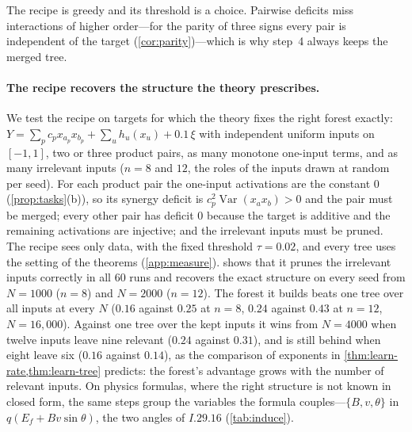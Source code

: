 \documentclass[11pt]{article}
\theoremstyle{definition}
\theoremstyle{remark}
\newcommand{\Var}{\operatorname{Var}}
\begin{document}
The recipe is greedy and its threshold is a choice.  Pairwise deficits miss interactions of
higher order---for the parity of three signs every pair is independent of the target
(\cref{cor:parity})---which is why step~4 always keeps the merged tree.  

\paragraph{The recipe recovers the structure the theory prescribes.}
We test the recipe on targets for which the theory fixes the right forest exactly:
$Y=\sum_pc_px_{a_p}x_{b_p}+\sum_uh_u(x_u)+0.1\,\xi$ with independent uniform inputs on $[-1,1]$, two or
three product pairs, as many monotone one-input terms, and as many irrelevant inputs ($n=8$
and $12$, the roles of the inputs drawn at random per seed).  For each product pair the
one-input activations are the constant $0$ (\cref{prop:tasks}(b)), so its synergy deficit is
$c_p^2\Var(x_ax_b)>0$ and the pair must be merged; every other pair has deficit $0$ because the
target is additive and the remaining activations are injective; and the irrelevant inputs
must be pruned.  The recipe sees only data, with the fixed threshold $\tau=0.02$, and every tree
uses the setting of the theorems (\cref{app:measure}).   shows that it prunes the
irrelevant inputs correctly in all $60$ runs and recovers the exact structure on every seed
from $N=1000$ ($n=8$) and $N=2000$ ($n=12$).  The forest it builds beats one tree over all
inputs at every $N$ ($0.16$ against $0.25$ at $n=8$, $0.24$ against $0.43$ at $n=12$, $N=16{,}000$).
Against one tree over the kept inputs it wins from $N=4000$ when twelve inputs leave nine
relevant ($0.24$ against $0.31$), and is still behind when eight leave six ($0.16$ against $0.14$),
as the comparison of exponents in \cref{thm:learn-rate,thm:learn-tree} predicts: the forest's
advantage grows with the number of relevant inputs.  On physics formulas, where the right
structure is not known in closed form, the same steps group the variables the formula
couples---$\{B,v,\theta\}$ in $q(E_f+Bv\sin\theta)$, the two angles of $I.29.16$
(\cref{tab:induce}).

\begin{table}[t]
\centering\small
{}
\caption{The recipe on targets with a known right structure (five seeds per row).
``recovered'': runs in which the merged groups and the pruned inputs are exactly the
prescribed ones; ``pruned'': runs with exactly the irrelevant inputs pruned.  Test
RMSE$/\mathrm{sd}(f)$ of one tree over all inputs, one tree over the kept inputs, and the
recipe's forest.}
\label{tab:recipe}
\end{table}
\end{document}
